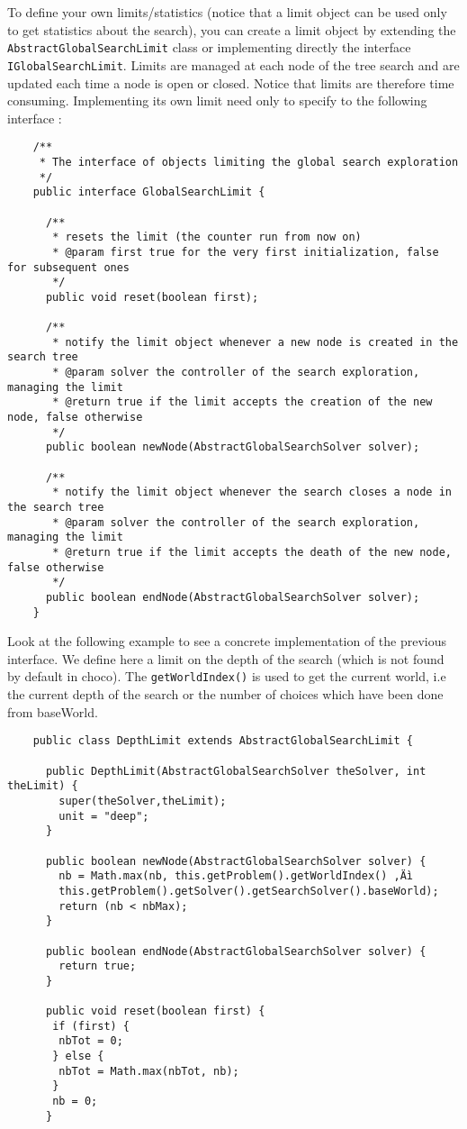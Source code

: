 To define your own limits/statistics (notice that a limit object can be used only to get statistics about the search), you can create a limit object by extending the \texttt{AbstractGlobalSearchLimit} class or implementing directly the interface \texttt{IGlobalSearchLimit}. Limits are managed at each node of the tree search and are updated each time a node is open or closed. Notice that limits are therefore time consuming. Implementing its own limit need only to specify to the following interface :

\begin{lstlisting}
	/**
	 * The interface of objects limiting the global search exploration
	 */
	public interface GlobalSearchLimit {

	  /**
	   * resets the limit (the counter run from now on)
	   * @param first true for the very first initialization, false for subsequent ones
	   */
	  public void reset(boolean first);
	
	  /**
	   * notify the limit object whenever a new node is created in the search tree
	   * @param solver the controller of the search exploration, managing the limit
	   * @return true if the limit accepts the creation of the new node, false otherwise
	   */
	  public boolean newNode(AbstractGlobalSearchSolver solver);
	
	  /**
	   * notify the limit object whenever the search closes a node in the search tree
	   * @param solver the controller of the search exploration, managing the limit
	   * @return true if the limit accepts the death of the new node, false otherwise
	   */
	  public boolean endNode(AbstractGlobalSearchSolver solver);
	}
\end{lstlisting}

Look at the following example to see a concrete implementation of the previous interface. We define here a limit on the depth of the search (which is not found by default in choco). The \texttt{getWorldIndex()} is used to get the current world, i.e the current depth of the search or the number of choices which have been done from baseWorld. 

\begin{lstlisting}
	public class DepthLimit extends AbstractGlobalSearchLimit {
	
	  public DepthLimit(AbstractGlobalSearchSolver theSolver, int theLimit) {
	    super(theSolver,theLimit);
	    unit = "deep";
	  }
	
	  public boolean newNode(AbstractGlobalSearchSolver solver) {
	    nb = Math.max(nb, this.getProblem().getWorldIndex() ‚Äì
	    this.getProblem().getSolver().getSearchSolver().baseWorld);
	    return (nb < nbMax);
	  }
	
	  public boolean endNode(AbstractGlobalSearchSolver solver) {
	    return true;
	  }
	
	  public void reset(boolean first) {
	   if (first) {
	    nbTot = 0;
	   } else {
	    nbTot = Math.max(nbTot, nb);
	   }
	   nb = 0;
	  }
\end{lstlisting}

